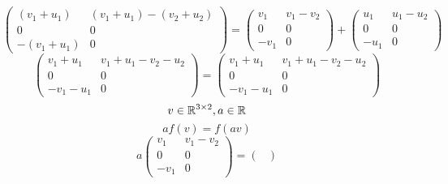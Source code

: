 \documentclass[../practica.root.tex]{subfiles}
\begin{document}
\begin{enumerate}
\begin{enumerate}
\[\begin{pmatrix}
                            (v_1 + u_1)  & (v_1 + u_1) - (v_2 + u_2) \\
                            0            & 0                         \\
                            -(v_1 + u_1) & 0
                        \end{pmatrix}
                        =
                        \begin{pmatrix}
                            v_1  & v_1 - v_2 \\
                            0    & 0         \\
                            -v_1 & 0
                        \end{pmatrix}
                        +
                        \begin{pmatrix}
                            u_1  & u_1 - u_2 \\
                            0    & 0         \\
                            -u_1 & 0
                        \end{pmatrix}
                    \] \[
                        \begin{pmatrix}
                            v_1 + u_1  & v_1 + u_1 - v_2 - u_2 \\
                            0          & 0                     \\
                            -v_1 - u_1 & 0
                        \end{pmatrix}
                        =
                        \begin{pmatrix}
                            v_1 + u_1 & v_1 + u_1 - v_2 - u_2 \\
                            0         & 0                     \\
                            -v_1-u_1  & 0
                        \end{pmatrix}
                    \]
                    \[ v \in \mathbb{R}^{3\times2}, a \in \mathbb{R} \]
                    \[ af(v) = f(av) \]
                    \[
                        a
                        \begin{pmatrix}
                            v_1  & v_1 - v_2 \\
                            0    & 0         \\
                            -v_1 & 0
                        \end{pmatrix}
                        =
                        \begin{pmatrix}

\end{pmatrix}\]
\end{enumerate}
\end{enumerate}
\end{document}
